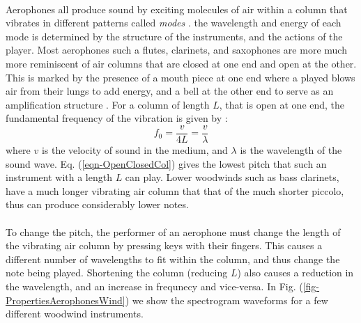 \documentclass[12pt,letterpaper]{article}
\begin{document}
\paragraph*{}Aerophones all produce sound by exciting molecules of air within a column that vibrates in different patterns called \textit{modes} \cite{White}. the wavelength and energy of each mode is  determined by the structure of the instruments, and the actions of the player. Most aerophones such a flutes, clarinets, and saxophones are more much more reminiscent of air columns that are closed at one end and open at the other. This is marked by the presence of a mouth piece at one end where a played blows air from their lungs to add energy, and a bell at the other end to serve as an amplification structure \cite{Olson}. For a column of length $L$, that is open at one end, the fundamental frequency of the vibration is given by \cite{Olson}:
\begin{equation}
\label{eqn-OpenClosedCol}
f_0 = \frac{v}{4L} = \frac{v}{\lambda}
\end{equation}
where $v$ is the velocity of sound in the medium, and $\lambda$ is the wavelength of the sound wave. Eq. (\ref{eqn-OpenClosedCol}) gives the lowest pitch that such an instrument with a length $L$ can play. Lower woodwinds such as bass clarinets, have a much longer vibrating air column that that of the much shorter piccolo, thus can produce considerably lower notes.

\paragraph*{}To change the pitch, the performer of an aerophone must change the length of the vibrating air column by pressing keys with their fingers. This causes a different number of wavelengths to fit within the column, and thus change the note being played. Shortening the column (reducing $L$) also causes a reduction in the wavelength, and an increase in frequnecy and vice-versa. In Fig. (\ref{fig-PropertiesAerophonesWind}) we show the spectrogram waveforms for a few different woodwind instruments.
\end{document}
